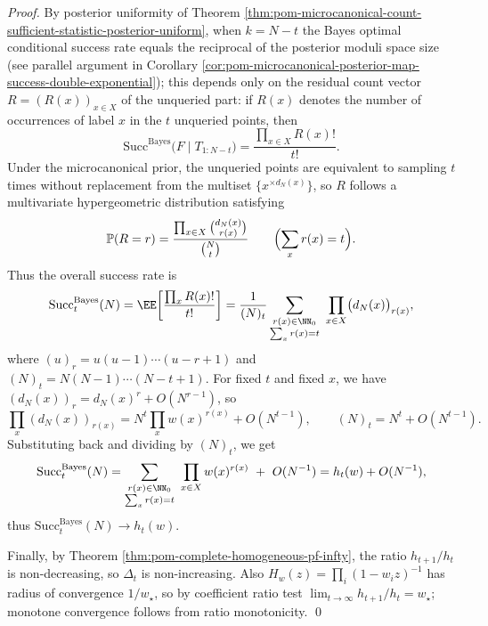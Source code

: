 \begin{proof}
By posterior uniformity of Theorem \ref{thm:pom-microcanonical-count-sufficient-statistic-posterior-uniform},
when \(k=N-t\) the Bayes optimal conditional success rate equals the reciprocal of the posterior moduli space size (see parallel argument in Corollary \ref{cor:pom-microcanonical-posterior-map-success-double-exponential});
this depends only on the residual count vector \(R=(R(x))_{x\in X}\) of the unqueried part:
if \(R(x)\) denotes the number of occurrences of label \(x\) in the \(t\) unqueried points, then
\[
\mathrm{Succ}^{\mathrm{Bayes}}\bigl(F\mid T_{1:N-t}\bigr)=\frac{\prod_{x\in X}R(x)!}{t!}.
\]
Under the microcanonical prior, the unqueried points are equivalent to sampling \(t\) times without replacement from the multiset \(\{x^{\times d_N(x)}\}\),
so \(R\) follows a multivariate hypergeometric distribution satisfying
\[
\mathbb{P}(R=r)=\frac{\prod_{x\in X}\binom{d_N(x)}{r(x)}}{\binom{N}{t}}
\qquad\Bigl(\sum_x r(x)=t\Bigr).
\]
Thus the overall success rate is
\[
\mathrm{Succ}^{\mathrm{Bayes}}_t(N)
=\EE\!\left[\frac{\prod_x R(x)!}{t!}\right]
=\frac{1}{(N)_t}\sum_{\substack{r(x)\in\NN_0\\ \sum_x r(x)=t}}\ \prod_{x\in X}\bigl(d_N(x)\bigr)_{r(x)},
\]
where \((u)_r=u(u-1)\cdots(u-r+1)\) and \((N)_t=N(N-1)\cdots(N-t+1)\).
For fixed \(t\) and fixed \(x\), we have \((d_N(x))_{r}=d_N(x)^{r}+O(N^{r-1})\), so
\[
\prod_x (d_N(x))_{r(x)}
=N^{t}\prod_x w(x)^{r(x)}+O(N^{t-1}),
\qquad
(N)_t=N^{t}+O(N^{t-1}).
\]
Substituting back and dividing by \((N)_t\), we get
\[
\mathrm{Succ}^{\mathrm{Bayes}}_t(N)
=\sum_{\substack{r(x)\in\NN_0\\ \sum_x r(x)=t}}\ \prod_{x\in X} w(x)^{r(x)}\ +\ O(N^{-1})
=h_t(w)+O(N^{-1}),
\]
thus \(\mathrm{Succ}^{\mathrm{Bayes}}_t(N)\to h_t(w)\).
\par
Finally, by Theorem \ref{thm:pom-complete-homogeneous-pf-infty}, the ratio \(h_{t+1}/h_t\) is non-decreasing, so \(\Delta_t\) is non-increasing.
Also \(H_w(z)=\prod_i(1-w_i z)^{-1}\) has radius of convergence \(1/w_\star\), so by coefficient ratio test \(\lim_{t\to\infty}h_{t+1}/h_t=w_\star\);
monotone convergence follows from ratio monotonicity. \qed
\end{proof}

